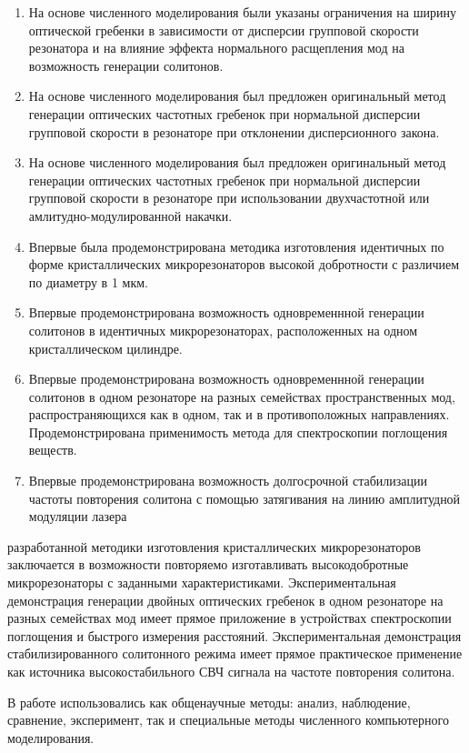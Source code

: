 {\novelty}
\begin{enumerate}
  \item На основе численного моделирования были указаны ограничения на ширину оптической гребенки в зависимости от дисперсии групповой скорости резонатора и на влияние эффекта нормального расщепления мод на возможность генерации солитонов.
  \item На основе численного моделирования был предложен оригинальный метод генерации оптических частотных гребенок при нормальной дисперсии групповой скорости в резонаторе при отклонении дисперсионного закона.
  \item На основе численного моделирования был предложен оригинальный метод генерации оптических частотных гребенок при нормальной дисперсии групповой скорости в резонаторе при использовании двухчастотной или амлитудно-модулированной накачки.
  \item Впервые была продемонстрирована методика изготовления идентичных по форме кристаллических микрорезонаторов высокой добротности с различием по диаметру в 1 мкм.
  \item Впервые продемонстрирована возможность одновременнной генерации солитонов в идентичных микрорезонаторах, расположенных на одном кристаллическом цилиндре.
  \item Впервые продемонстрирована возможность одновременнной генерации солитонов в одном резонаторе на разных семействах пространственных мод, распространяющихся как в одном, так и в противоположных направлениях. Продемонстрирована применимость метода для спектроскопии поглощения веществ.
  \item Впервые продемонстрирована возможность долгосрочной стабилизации частоты повторения солитона с помощью затягивания на линию амплитудной модуляции лазера
\end{enumerate}

{\influence} разработанной методики изготовления кристаллических микрорезонаторов заключается в возможности повторяемо изготавливать высокодобротные микрорезонаторы с заданными характеристиками. Экспериментальная демонстрация генерации двойных оптических гребенок в одном резонаторе на разных семействах мод имеет прямое приложение в устройствах спектроскопии поглощения и быстрого измерения расстояний. Экспериментальная демонстрация стабилизированного солитонного режима имеет прямое практическое применение как источника высокостабильного СВЧ сигнала на частоте повторения солитона.

{\methods} В работе использовались как общенаучные методы: анализ, наблюдение, сравнение, эксперимент, так и специальные методы численного компьютерного моделирования.

